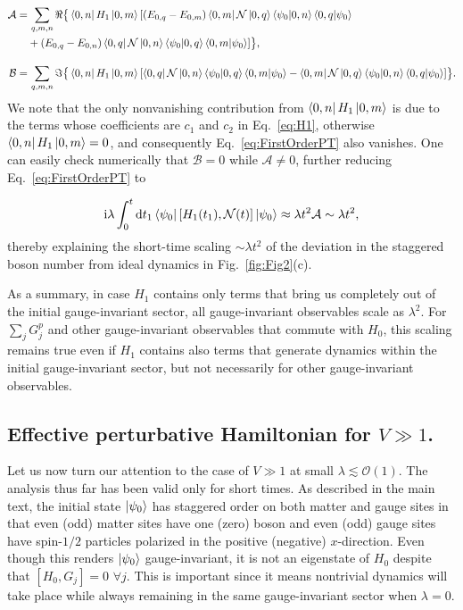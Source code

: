 \documentclass[aps,prl,reprint,twocolumn,superscriptaddress,floatfix,nofootinbib]{revtex4-1}
\def\d{\mathrm d}
\def\d{\mathrm d}
\begin{document}
\begin{align}\nonumber
\mathcal{A}=&\,\sum_{q,m,n}\real\big\{\bra{0,n}H_1\ket{0,m}[(E_{0,q}-E_{0,m})\bra{0,m}\mathcal{N}\ket{0,q}\bra{\psi_0}\ket{0,n}\bra{0,q}\ket{\psi_0}\\
&+(E_{0,q}-E_{0,n})\bra{0,q}\mathcal{N}\ket{0,n}\bra{\psi_0}\ket{0,q}\bra{0,m}\ket{\psi_0}]\big\},\\[1em]
\mathcal{B}=&\,\sum_{q,m,n}\imaginary\big\{\bra{0,n}H_1\ket{0,m}[\bra{0,q}\mathcal{N}\ket{0,n}\bra{\psi_0}\ket{0,q}\bra{0,m}\ket{\psi_0}-\bra{0,m}\mathcal{N}\ket{0,q}\bra{\psi_0}\ket{0,n}\bra{0,q}\ket{\psi_0}]\big\}.
\end{align}
We note that the only nonvanishing contribution from $\bra{0,n}H_1\ket{0,m}$ is due to the terms whose coefficients are $c_1$ and $c_2$ in Eq.~\eqref{eq:H1}, otherwise $\bra{0,n}H_1\ket{0,m}=0$, and consequently Eq.~\eqref{eq:FirstOrderPT} also vanishes. One can easily check numerically that $\mathcal{B}=0$ while $\mathcal{A}\neq0$, further reducing Eq.~\eqref{eq:FirstOrderPT} to

\begin{align}\nonumber
\mathrm{i}\lambda\int_0^t\d t_1\bra{\psi_0}[H_1(t_1),\mathcal{N}(t)]\ket{\psi_0}\approx\lambda t^2\mathcal{A}\sim\lambda t^2,
\end{align}
thereby explaining the short-time scaling $\sim\lambda t^2$ of the deviation in the staggered boson number from ideal dynamics in Fig.~\ref{fig:Fig2}(c).

As a summary, in case $H_1$ contains only terms that bring us completely out of the initial gauge-invariant sector, all gauge-invariant observables scale as $\lambda^2$. For $\sum_jG_j^p$ and other gauge-invariant observables that commute with $H_0$, this scaling remains true even if $H_1$ contains also terms that generate dynamics within the initial gauge-invariant sector, but not necessarily for other gauge-invariant observables.%

\subsection{Effective perturbative Hamiltonian for $V\gg 1$.}
Let us now turn our attention to the case of $V\gg 1$ at small $\lambda\lesssim\mathcal{O}(1)$. The analysis thus far has been valid only for short times. As described in the main text, the initial state $\ket{\psi_0}$ has staggered order on both matter and gauge sites in that even (odd) matter sites have one (zero) boson and even (odd) gauge sites have spin-$1/2$ particles polarized in the positive (negative) $x$-direction. Even though this renders $\ket{\psi_0}$ gauge-invariant, it is not an eigenstate of $H_0$ despite that $[H_0,G_j]=0$ $\forall j$. This is important since it means nontrivial dynamics will take place while always remaining in the same gauge-invariant sector when $\lambda=0$. 
\end{document}

